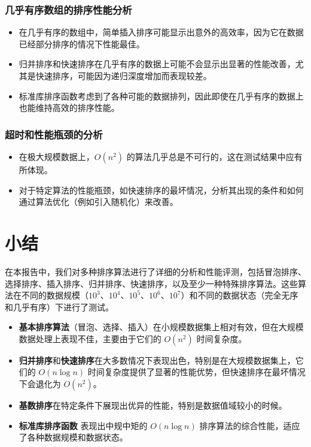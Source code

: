 \documentclass[12pt]{article}
\begin{document}
\subsubsection{几乎有序数组的排序性能分析}
\begin{itemize}
    \item 在几乎有序的数组中，简单插入排序可能显示出意外的高效率，因为它在数据已经部分排序的情况下性能最佳。
    \item 归并排序和快速排序在几乎有序的数据上可能不会显示出显著的性能改善，尤其是快速排序，可能因为递归深度增加而表现较差。
    \item 标准库排序函数考虑到了各种可能的数据排列，因此即使在几乎有序的数据上也能维持高效的排序性能。
\end{itemize}

\subsubsection{超时和性能瓶颈的分析}
\begin{itemize}
    \item 在极大规模数据上，$O(n^2)$ 的算法几乎总是不可行的，这在测试结果中应有所体现。
    \item 对于特定算法的性能瓶颈，如快速排序的最坏情况，分析其出现的条件和如何通过算法优化（例如引入随机化）来改善。
\end{itemize}

\newpage

\section{小结}

在本报告中，我们对多种排序算法进行了详细的分析和性能评测，包括冒泡排序、选择排序、插入排序、归并排序、快速排序，以及至少一种特殊排序算法。这些算法在不同的数据规模（$10^3$、$10^4$、$10^5$、$10^6$、$10^7$）和不同的数据状态（完全无序和几乎有序）下进行了测试。

\begin{itemize}
    \item \textbf{基本排序算法}（冒泡、选择、插入）在小规模数据集上相对有效，但在大规模数据处理上表现不佳，主要由于它们的 $O(n^2)$ 时间复杂度。
    \item \textbf{归并排序}和\textbf{快速排序}在大多数情况下表现出色，特别是在大规模数据集上，它们的 $O(n\log n)$ 时间复杂度提供了显著的性能优势，但快速排序在最坏情况下会退化为 $O(n^2)$。
    \item \textbf{基数排序}在特定条件下展现出优异的性能，特别是数据值域较小的时候。
    \item \textbf{标准库排序函数} 表现出中规中矩的 $O(n\log n)$ 排序算法的综合性能，适应了各种数据规模和数据状态。
\end{itemize}
\end{document}
